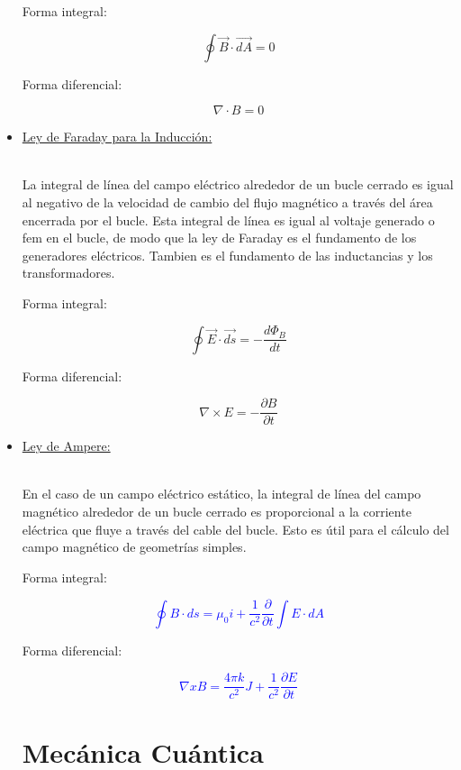 \documentclass[letterpaper,12pt]{article}
\begin{document}
\begin{itemize}
{    Forma integral:
    
    $$\oint\vec{B}\cdot\vec{dA}=0$$
    
    Forma diferencial:
    
    $$\nabla\cdot B=0$$
    
    }

    \item[\HandRight]\large{\underline{Ley de Faraday para la Inducción:}}\\\\
    \small{La integral de línea del campo eléctrico alrededor de un bucle cerrado es igual al negativo de la velocidad de cambio del flujo magnético a través del área encerrada por el bucle. Esta integral de línea es igual al voltaje generado o fem en el bucle, de modo que la ley de Faraday es el fundamento de los generadores eléctricos. Tambien es el fundamento de las inductancias y los transformadores.
    
    Forma integral:
    
    $$\oint\vec{E}\cdot\vec{ds}=-\frac{d\Phi_B}{dt}$$
    
    Forma diferencial:
    
    $$\nabla\times E=-\frac{\partial B}{\partial t}$$
    
    }
    
    \item[\HandRight]\large{\underline{Ley de Ampere:}}\\\\
    \small{En el caso de un campo eléctrico estático, la integral de línea del campo magnético alrededor de un bucle cerrado es proporcional a la corriente eléctrica que fluye a través del cable del bucle. Esto es útil para el cálculo del campo magnético de geometrías simples.
    
    Forma integral:
    
    \textcolor{blue}{$$\oint B\cdot ds=\mu_0i+\frac{1}{c^2}\frac{\partial}{\partial t}\int E\cdot dA$$}
    
    Forma diferencial:
    
    \textcolor{blue}{$$\nabla xB=\frac{4\pi k}{c^2}J+\frac{1}{c^2}\frac{\partial E}{\partial t}$$}
    
    }
    
    \pagestyle{fancy}

    \fancyhf{}
    \rfoot{\thepage}
    
\section{\Large{Mecánica Cuántica}}
    

\end{itemize}
\end{document}

